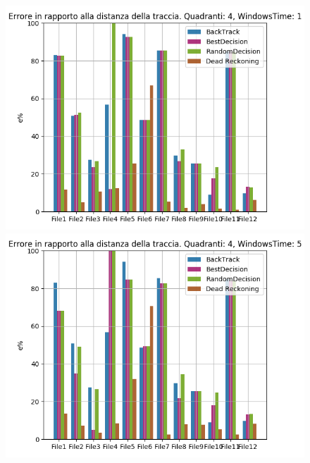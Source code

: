 \documentclass[12pt,a4paper,openright,twoside]{report}
\begin{document}
\begin{figure}[H]
\centering 
\includegraphics[scale=0.4]{firstChart4-1} 
\includegraphics[scale=0.4]{firstChart4-5} 
\end{figure}
\end{document}
